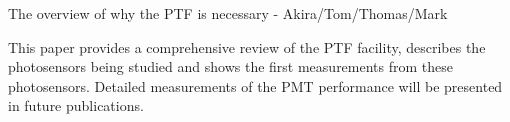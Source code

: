 
The overview of why the PTF is necessary - Akira/Tom/Thomas/Mark

This paper provides a comprehensive review of the PTF facility, describes the photosensors being studied and shows the first measurements from these photosensors.
Detailed measurements of the PMT performance will be presented in future publications.

